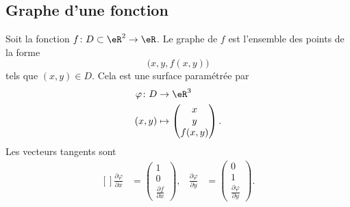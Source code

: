 \subsection{Graphe d'une fonction}

Soit la fonction \( f\colon D\subset\eR^2\to \eR\). Le graphe de \( f\) est l'ensemble des points de la forme
\begin{equation}
	\big( x,y,f(x,y) \big)
\end{equation}
tels que \( (x,y)\in D\). Cela est une surface paramétrée par
\begin{equation}
	\begin{aligned}
		\varphi\colon D & \to \eR^3              \\
		(x,y)           & \mapsto \begin{pmatrix}
			                          x \\
			                          y \\
			                          f(x,y)
		                          \end{pmatrix}.
	\end{aligned}
\end{equation}
Les vecteurs tangents sont
\begin{equation}
	\begin{aligned}[]
		\frac{ \partial \varphi }{ \partial x } & =\begin{pmatrix}
			                                           1 \\
			                                           0 \\
			                                           \frac{ \partial f }{ \partial x }
		                                           \end{pmatrix},
		                                        & \frac{ \partial \varphi }{ \partial y } & =\begin{pmatrix}
			                                                                                     0 \\
			                                                                                     1 \\
			                                                                                     \frac{ \partial \varphi }{ \partial y }
		                                                                                     \end{pmatrix}.
	\end{aligned}
\end{equation}
